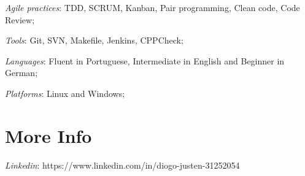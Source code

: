 \documentclass[margin]{res}
\begin{document}
\begin{resume}
 \textit{Agile practices}: TDD, SCRUM, Kanban, Pair programming, Clean code, Code Review;
 
 \textit{Tools}: Git, SVN, Makefile, Jenkins, CPPCheck;
 
 \textit{Languages}: Fluent in Portuguese, Intermediate in English and Beginner in German;

 \textit{Platforms}: Linux and Windows;
 
\section{More Info} \textit{Linkedin}: https://www.linkedin.com/in/diogo-justen-31252054

\end{resume}
\end{document}
